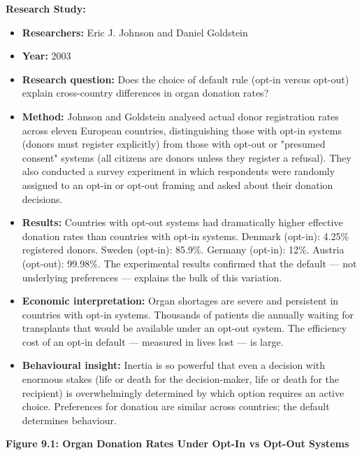 \documentclass[12pt, letterpaper]{article}
\begin{document}
\textbf{Research Study:}
\begin{itemize}
\item \textbf{Researchers:} Eric J. Johnson and Daniel Goldstein
\item \textbf{Year:} 2003
\item \textbf{Research question:} Does the choice of default rule (opt-in versus opt-out) explain cross-country differences in organ donation rates?
\item \textbf{Method:} Johnson and Goldstein analysed actual donor registration rates across eleven European countries, distinguishing those with opt-in systems (donors must register explicitly) from those with opt-out or "presumed consent" systems (all citizens are donors unless they register a refusal). They also conducted a survey experiment in which respondents were randomly assigned to an opt-in or opt-out framing and asked about their donation decisions.
\item \textbf{Results:} Countries with opt-out systems had dramatically higher effective donation rates than countries with opt-in systems. Denmark (opt-in): 4.25\% registered donors. Sweden (opt-in): 85.9\%. Germany (opt-in): 12\%. Austria (opt-out): 99.98\%. The experimental results confirmed that the default --- not underlying preferences --- explains the bulk of this variation.
\item \textbf{Economic interpretation:} Organ shortages are severe and persistent in countries with opt-in systems. Thousands of patients die annually waiting for transplants that would be available under an opt-out system. The efficiency cost of an opt-in default --- measured in lives lost --- is large.
\item \textbf{Behavioural insight:} Inertia is so powerful that even a decision with enormous stakes (life or death for the decision-maker, life or death for the recipient) is overwhelmingly determined by which option requires an active choice. Preferences for donation are similar across countries; the default determines behaviour.
\end{itemize}
\newpage
\textbf{Figure 9.1: Organ Donation Rates Under Opt-In vs Opt-Out Systems}
\end{document}
